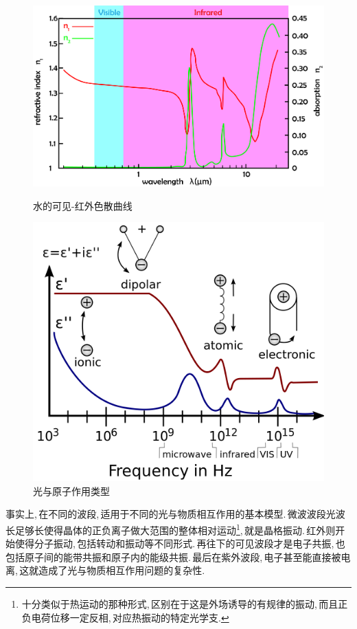 \begin{figure}[H]
\centering
\begin{minipage}{0.53\textwidth}
\includegraphics[width=\textwidth]{image/18-1-3.png}
\caption{水的可见-红外色散曲线}
\end{minipage}
\qquad
\begin{minipage}{0.38\textwidth}
\includegraphics[width=\textwidth]{image/18-1-4.png}
\caption{光与原子作用类型}
\end{minipage}
\end{figure}

事实上,\,在不同的波段,\,适用于不同的光与物质相互作用的基本模型.\,微波波段光波长足够长使得晶体的正负离子做大范围的整体相对运动\footnote{十分类似于热运动的那种形式,\,区别在于这是外场诱导的有规律的振动,\,而且正负电荷位移一定反相,\,对应热振动的特定光学支.},\,就是晶格振动.\,红外则开始使得分子振动,\,包括转动和振动等不同形式.\,再往下的可见波段才是电子共振,\,也包括原子间的能带共振和原子内的能级共振.\,最后在紫外波段,\,电子甚至能直接被电离,\,这就造成了光与物质相互作用问题的复杂性.

